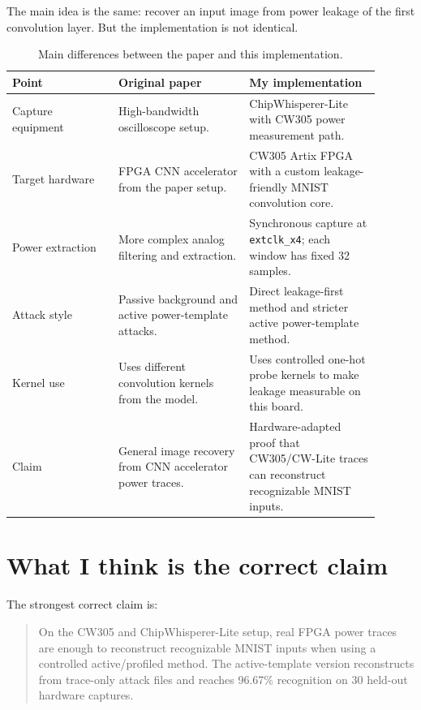 \documentclass[11pt]{article}
\begin{document}
The main idea is the same: recover an input image from power leakage of the first
convolution layer. But the implementation is not identical.

\begin{table}[H]
\centering
\caption{Main differences between the paper and this implementation.}
\label{tab:compare}
\begin{tabular}{>{\raggedright\arraybackslash}p{0.26\linewidth}
                >{\raggedright\arraybackslash}p{0.32\linewidth}
                >{\raggedright\arraybackslash}p{0.32\linewidth}}
\toprule
Point & Original paper & My implementation \\
\midrule
Capture equipment
& High-bandwidth oscilloscope setup.
& ChipWhisperer-Lite with CW305 power measurement path. \\
Target hardware
& FPGA CNN accelerator from the paper setup.
& CW305 Artix FPGA with a custom leakage-friendly MNIST convolution core. \\
Power extraction
& More complex analog filtering and extraction.
& Synchronous capture at \texttt{extclk\_x4}; each window has fixed 32 samples. \\
Attack style
& Passive background and active power-template attacks.
& Direct leakage-first method and stricter active power-template method. \\
Kernel use
& Uses different convolution kernels from the model.
& Uses controlled one-hot probe kernels to make leakage measurable on this board. \\
Claim
& General image recovery from CNN accelerator power traces.
& Hardware-adapted proof that CW305/CW-Lite traces can reconstruct recognizable
MNIST inputs. \\
\bottomrule
\end{tabular}
\end{table}

\section*{What I think is the correct claim}

The strongest correct claim is:

\begin{quote}
On the CW305 and ChipWhisperer-Lite setup, real FPGA power traces are enough to
reconstruct recognizable MNIST inputs when using a controlled active/profiled
method. The active-template version reconstructs from trace-only attack files
and reaches 96.67\% recognition on 30 held-out hardware captures.
\end{quote}
\end{document}
